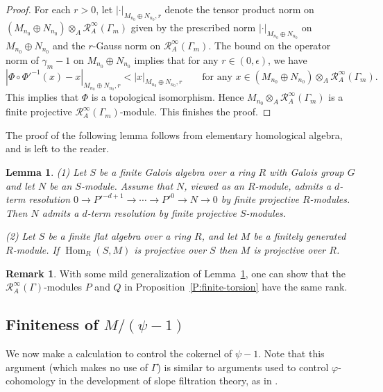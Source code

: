 \documentclass[12pt]{article}
\newtheorem{lemma}[theorem]{Lemma}
\theoremstyle{definition}
\newtheorem{remark}[theorem]{Remark}
\numberwithin{equation}{theorem}
\newcommand{\calR}{\mathcal{R}}
\DeclareMathOperator{\Hom}{Hom}
\begin{document}
\begin{proof}
For each $r>0$, let $|\cdot|_{M_{n_0} \oplus N_{n_0},r}$ denote the
tensor product norm on $(M_{n_0} \oplus N_{n_0}) \otimes_A
\calR_A^\infty(\Gamma_m)$ given by the prescribed norm
$|\cdot|_{M_{n_0} \oplus N_{n_0}}$ on $M_{n_0} \oplus N_{n_0}$ and the
$r$-Gauss norm on $\calR_A^\infty(\Gamma_m)$.  The bound on the
operator norm of $\gamma_m-1$ on $M_{n_0} \oplus N_{n_0}$ implies that
for any $r \in (0, \epsilon)$, we have
\[
|\Phi \circ \Phi'^{-1}(x) - x|_{M_{n_0} \oplus N_{n_0},r}
  < |x|_{M_{n_0} \oplus N_{n_0},r}
\qquad
\text{for any } x \in (M_{n_0} \oplus N_{n_0}) \otimes_A
  \calR_A^\infty(\Gamma_m).
\]
This implies that $\Phi$ is a topological isomorphism. Hence $M_{n_0}
\otimes_A \calR_A^\infty(\Gamma_m)$ is a finite projective
$\calR_A^\infty(\Gamma_m)$-module. This finishes the proof.
\end{proof}

The proof of the following lemma follows from elementary homological
algebra, and is left to the reader.

\begin{lemma}
\label{L:resolution stable under finite Galois base change}
(1) Let $S$ be a finite Galois algebra over a ring $R$ with Galois
group $G$ and let $N$ be an $S$-module.  Assume that $N$, viewed as an
$R$-module, admits a $d$-term resolution $0 \to P'^{-d+1} \to \cdots
\to P'^0 \to N \to 0$ by finite projective $R$-modules.  Then $N$
admits a $d$-term resolution by finite projective $S$-modules.

(2) Let $S$ be a finite flat algebra over a ring $R$, and let $M$ be a
finitely generated $R$-module.  If $\Hom_R(S,M)$ is projective over
$S$ then $M$ is projective over $R$.
\end{lemma}


\begin{remark}
With some mild generalization of Lemma~\ref{L:resolution stable under finite Galois base change}, one can show that the $\calR_A^\infty(\Gamma)$-modules $P$ and $Q$ in Proposition~\ref{P:finite-torsion} have the same rank.
\end{remark}

\subsection{Finiteness of $M / (\psi-1)$}

We now make a calculation to control the cokernel of $\psi-1$. Note
that this argument (which makes no use of $\Gamma$) is similar to
arguments used to control $\varphi$-cohomology in the development of
slope filtration theory, as in
\cite[Proposition~2.1.5]{kedlaya-relative}.
\end{document}

